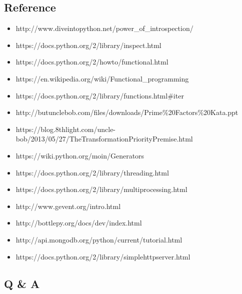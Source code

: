 \documentclass[11pt]{article}
\providecommand{\tightlist}{%
      \setlength{\itemsep}{0pt}\setlength{\parskip}{0pt}}
\begin{document}
    \hypertarget{reference}{%
\subsection{Reference}\label{reference}}

\begin{itemize}
\tightlist
\item
  http://www.diveintopython.net/power\_of\_introspection/
\item
  https://docs.python.org/2/library/inspect.html
\item
  https://docs.python.org/2/howto/functional.html
\item
  https://en.wikipedia.org/wiki/Functional\_programming
\item
  https://docs.python.org/2/library/functions.html\#iter
\item
  http://butunclebob.com/files/downloads/Prime\%20Factors\%20Kata.ppt
\item
  https://blog.8thlight.com/uncle-bob/2013/05/27/TheTransformationPriorityPremise.html
\item
  https://wiki.python.org/moin/Generators
\item
  https://docs.python.org/2/library/threading.html
\item
  https://docs.python.org/2/library/multiprocessing.html
\item
  http://www.gevent.org/intro.html
\item
  http://bottlepy.org/docs/dev/index.html
\item
  http://api.mongodb.org/python/current/tutorial.html
\item
  https://docs.python.org/2/library/simplehttpserver.html
\end{itemize}

    \hypertarget{q-a}{%
\subsection{Q \& A}\label{q-a}}


    
    
    
    
\end{document}
